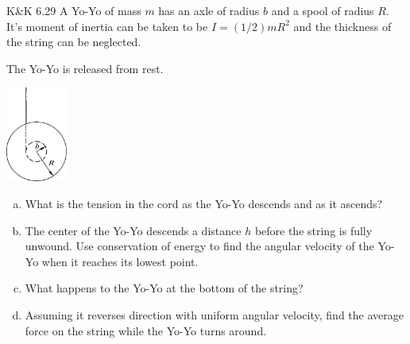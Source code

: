 \documentclass{esg8012pset}
\begin{document}
\begin{problem}{K\&K 6.29}
  A Yo-Yo of mass $m$ has an axle of radius $b$ and a spool of radius $R$. It's moment of inertia can be taken to be $I = (1/2)mR^2$ and the thickness of the string can be neglected.

  The Yo-Yo is released from rest.
  \begin{center}\includegraphics[width=0.15\textwidth]{ps09_4}\end{center}
  \begin{enumerate}[(a)]
    \item What is the tension in the cord as the Yo-Yo descends and as it ascends?
    \item The center of the Yo-Yo descends a distance $h$ before the string is fully unwound. Use conservation of energy to find the angular velocity of the Yo-Yo when it reaches its lowest point.
    \item What happens to the Yo-Yo at the bottom of the string?
    \item Assuming it reverses direction with uniform angular velocity, find the average force on the string while the Yo-Yo turns around.
  \end{enumerate}
\end{problem}
\end{document}
